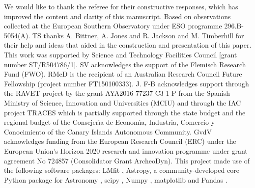 \documentclass{aa}
\begin{document}
\begin{acknowledgements}
We would like to thank the referee for their constructive responses, which has improved the content and clarity of this manuscript. Based on observations collected at the European Southern Observatory under ESO programme 296.B-5054(A). TS thanks A. Bittner, A. Jones and R. Jackson and M. Timberhill for their help and ideas that aided in the construction and presentation of this paper. This work was supported by Science and Technology Facilities Council [grant number ST/R504786/1]. SV acknowledges the support of the Flemisch Research Fund (FWO). RMcD is the recipient of an Australian Research Council Future Fellowship (project number FT150100333). J. F-B acknowledges support through the RAVET project by the grant AYA2016-77237-C3-1-P from the Spanish Ministry of Science, Innovation and Universities (MCIU) and through the IAC project TRACES which is partially supported through the state budget and the regional budget of the Consejer\'\i a de Econom\'\i a, Industria, Comercio y Conocimiento of the Canary Islands Autonomous Community. GvdV acknowledges funding from the European Research Council (ERC) under the European Union's Horizon 2020 research and innovation programme under grant agreement No 724857 (Consolidator Grant ArcheoDyn). This project made use of the following software packages: LMfit \citep{newville_lmfit_2014, newville_lmfitlmfit-py_2019}, Astropy, a community-developed core Python package for Astronomy \citep{robitaille_astropy_2013}, scipy \citep{eric_jones_and_travis_oliphant_and_pearu_peterson_and_et_al_scipy_2001}, Numpy \citep{van_der_walt_numpy_2011}, matplotlib \citep{hunter_matplotlib_2007} and Pandas \citep{mckinney_data_2010}.
\end{acknowledgements}






\end{document}
